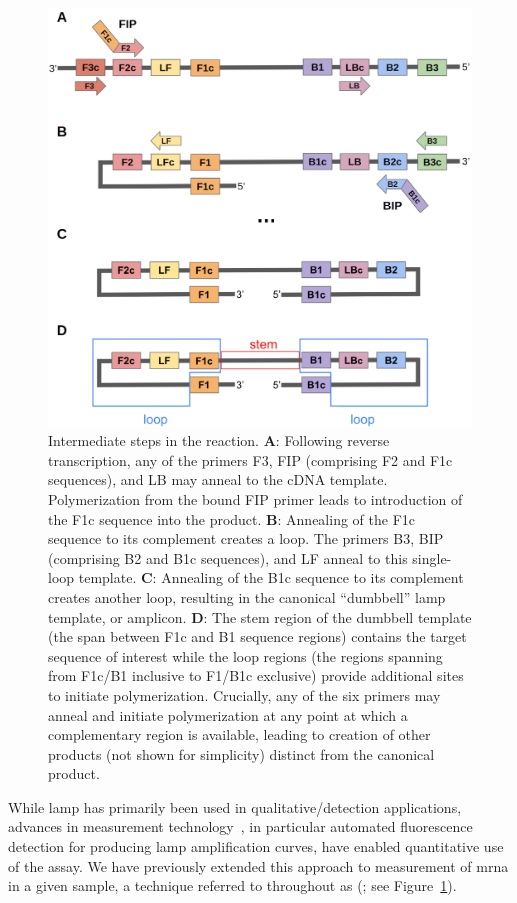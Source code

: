 \documentclass[../thesis.tex]{subfiles}
\begin{document}
\begin{figure}[!tpb] 
\centering
\includegraphics[width=5in]{../figures/chapter2/paper_lamp_fig.png}
\caption{Intermediate steps in the  reaction. \textbf{A}: Following reverse transcription, any of the primers F3, FIP (comprising F2 and F1c sequences), and LB may anneal to the cDNA template. Polymerization from the bound FIP primer leads to introduction of the F1c sequence into the product. \textbf{B}: Annealing of the F1c sequence to its complement creates a loop. The primers B3, BIP (comprising B2 and B1c sequences), and LF anneal to this single-loop template. \textbf{C}: Annealing of the B1c sequence to its complement creates another loop, resulting in the canonical ``dumbbell'' \gls{lamp} template, or amplicon. \textbf{D}: The stem region of the dumbbell template (the span between F1c and B1 sequence regions) contains the target sequence of interest while the loop regions (the regions spanning from F1c/B1 inclusive to F1/B1c exclusive) provide additional sites to initiate polymerization. Crucially, any of the six primers may anneal and initiate polymerization at any point at which a complementary region is available, leading to creation of other products (not shown for simplicity) distinct from the canonical product.\label{fig:lampoverview}}
\end{figure}
While \gls{lamp} has primarily been used in qualitative/detection applications, advances in measurement technology~\citep{zhang_brief_2014, becherer_loop-mediated_2020}, in particular automated fluorescence detection for producing \gls{lamp} amplification curves, have enabled quantitative use of the assay. We have previously extended this approach to measurement of \gls{mrna} in a given sample, a technique referred to throughout as  (\citealp{remmel_diagnostic_2022}; see Figure~\ref{fig:lampoverview}). 
\end{document}

